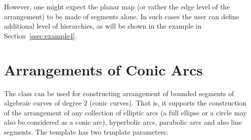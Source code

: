  However, one might expect the planar map (or rather the edge level of the 
arrangement) to be made of segments alone. In such cases the user can define 
additional level of hierarchies, as will be shown in the example in 
Section~\ref{ssec:example4}.


\section{Arrangements of Conic Arcs}

The  class can be used for
constructing arrangement of bounded segments of algebraic curves of degree 2
(conic curves).
That is, it supports the construction of the arrangement of any 
collection of elliptic arcs (a full ellipse or a circle may also be considered
as a conic arc), hyperbolic arcs, parabolic arcs and also line segments.
The template has two template parameters:
